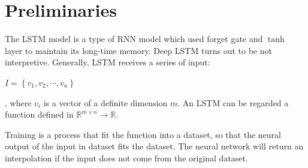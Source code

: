 \documentclass[]{article}
\begin{document}
\section{Preliminaries}
The LSTM model is a type of RNN model which used forget gate and $\tanh$ layer to maintain its long-time memory. Deep LSTM turns out to be not interpretive. Generally, LSTM receives a series of input:
\begin{center}
\begin{math}
I = \left\{
v_1, v_2, \cdots, v_n
\right\}
\end{math}
\end{center}
, where $v_i$ is a vector of a definite dimension $m$. An LSTM can be regarded a function defined in $\mathbb{R}^{m \times n}\rightarrow \mathbb{R}$.
\par
Training is a process that fit the function into a dataset, so that the neural output of the input in dataset fits the dataset. The neural network will return an interpolation if the input does not come from the original dataset.
\end{document}
